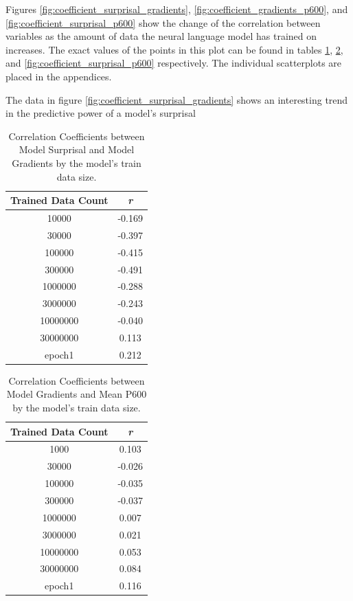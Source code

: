 \documentclass{IEEEtran}
\begin{document}
Figures \ref{fig:coefficient_surprisal_gradients}, \ref{fig:coefficient_gradients_p600}, and \ref{fig:coefficient_surprisal_p600} show the change of the correlation between variables as the amount of data the neural language model has trained on increases.
The exact values of the points in this plot can be found in tables \ref{tab:correlation_surprisal_gradients}, \ref{tab:correlation_gradients_p600}, and \ref{fig:coefficient_surprisal_p600} respectively.
The individual scatterplots are placed in the appendices.

The data in figure \ref{fig:coefficient_surprisal_gradients} shows an interesting trend in the predictive power of a model's surprisal 

\begin{table}
    \centering
    \begin{tabular}{c|c}
        \textbf{Trained Data Count} & \textbf{\textit{r}} \\
        \hline
        10000&-0.169\\
        30000&-0.397\\
        100000&-0.415\\
        300000&-0.491\\
        1000000&-0.288\\
        3000000&-0.243\\
        10000000&-0.040\\
        30000000&0.113\\
        epoch1&0.212
    \end{tabular}
    \caption{Correlation Coefficients between Model Surprisal and Model Gradients by the model's train data size.}
    \label{tab:correlation_surprisal_gradients}
\end{table}
\begin{table}
    \centering
    \begin{tabular}{c|c}
        \textbf{Trained Data Count} & \textbf{\textit{r}} \\
        \hline
        1000&0.103\\
        30000&-0.026\\
        100000&-0.035\\
        300000&-0.037\\
        1000000&0.007\\
        3000000&0.021\\
        10000000&0.053\\
        30000000&0.084\\
        epoch1&0.116
    \end{tabular}
    \caption{Correlation Coefficients between Model Gradients and Mean P600 by the model's train data size.}
    \label{tab:correlation_gradients_p600}
\end{table}
\end{document}
